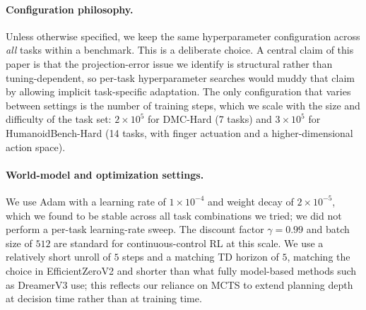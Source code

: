 \paragraph{Configuration philosophy.} Unless otherwise specified, we keep the same hyperparameter configuration across \textit{all} tasks within a benchmark. This is a deliberate choice. A central claim of this paper is that the projection-error issue we identify is structural rather than tuning-dependent, so per-task hyperparameter searches would muddy that claim by allowing implicit task-specific adaptation. The only configuration that varies between settings is the number of training steps, which we scale with the size and difficulty of the task set: $2\times 10^{5}$ for DMC-Hard (7 tasks) and $3\times 10^{5}$ for HumanoidBench-Hard (14 tasks, with finger actuation and a higher-dimensional action space).

\paragraph{World-model and optimization settings.} We use Adam with a learning rate of $1\times 10^{-4}$ and weight decay of $2\times 10^{-5}$, which we found to be stable across all task combinations we tried; we did not perform a per-task learning-rate sweep. The discount factor $\gamma=0.99$ and batch size of $512$ are standard for continuous-control RL at this scale. We use a relatively short unroll of $5$ steps and a matching TD horizon of $5$, matching the choice in EfficientZeroV2 and shorter than what fully model-based methods such as DreamerV3 use; this reflects our reliance on MCTS to extend planning depth at decision time rather than at training time.

